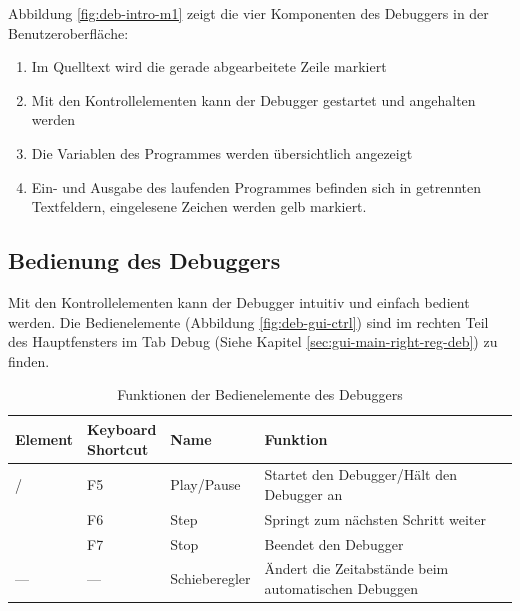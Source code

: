 Abbildung \ref{fig:deb-intro-m1} zeigt die vier Komponenten des Debuggers in der Benutzeroberfläche:
\begin{enumerate}
\item Im Quelltext wird die gerade abgearbeitete Zeile markiert
\item Mit den Kontrollelementen kann der Debugger gestartet und angehalten werden
\item Die Variablen des Programmes werden übersichtlich angezeigt
\item Ein- und Ausgabe des laufenden Programmes befinden sich in getrennten Textfeldern, eingelesene Zeichen werden gelb markiert.
\end{enumerate}



\subsection{Bedienung des Debuggers}

Mit den Kontrollelementen kann der Debugger intuitiv und einfach bedient werden. Die Bedienelemente (Abbildung \ref{fig:deb-gui-ctrl}) sind im rechten Teil des Hauptfensters im Tab \glqq{}Debug\grqq{} (Siehe Kapitel \ref{sec:gui-main-right-reg-deb}) zu finden.

\def\arraystretch{1.4}
\begin{table}[h]
\begin{tabular}{|l|l|l|l|}
	\hline
	Element & \parbox{2cm}{Keyboard\\Shortcut}& Name & Funktion\\
	\hline
	 / \thinspace {} & F5 & Play/Pause & Startet den Debugger/Hält den Debugger an\\
	\thinspace {} & F6 & Step & Springt zum nächsten Schritt weiter\\
	 & F7 & Stop & Beendet den Debugger\\
	--- & --- & Schieberegler & \parbox{7cm}{Ändert die Zeitabstände beim automatischen Debuggen}\\
	\hline
\end{tabular}
\caption{Funktionen der Bedienelemente des Debuggers}\label{tab:deb-ctrl}
\end{table}



